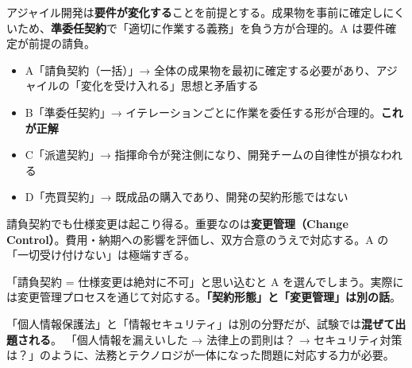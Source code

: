
\begin{kaisetsu}
アジャイル開発は\textbf{要件が変化する}ことを前提とする。成果物を事前に確定しにくいため、\textbf{準委任契約}で「適切に作業する義務」を負う方が合理的。A は要件確定が前提の請負。
\end{kaisetsu}

\begin{goutoubun}
\begin{itemize}
  \item A「請負契約（一括）」→ 全体の成果物を最初に確定する必要があり、アジャイルの「変化を受け入れる」思想と矛盾する
  \item B「準委任契約」→ イテレーションごとに作業を委任する形が合理的。\textbf{これが正解}
  \item C「派遣契約」→ 指揮命令が発注側になり、開発チームの自律性が損なわれる
  \item D「売買契約」→ 既成品の購入であり、開発の契約形態ではない
\end{itemize}
\end{goutoubun}


\begin{kaisetsu}
請負契約でも仕様変更は起こり得る。重要なのは\textbf{変更管理（Change Control）}。費用・納期への影響を評価し、双方合意のうえで対応する。A の「一切受け付けない」は極端すぎる。
\end{kaisetsu}

\begin{trickwarn}
「請負契約 = 仕様変更は絶対に不可」と思い込むと A を選んでしまう。実際には変更管理プロセスを通じて対応する。\textbf{「契約形態」と「変更管理」は別の話}。
\end{trickwarn}



\mondaipage
{}

\begin{stumble}
「個人情報保護法」と「情報セキュリティ」は別の分野だが、試験では\textbf{混ぜて出題される}。
「個人情報を漏えいした → 法律上の罰則は？ → セキュリティ対策は？」のように、法務とテクノロジが一体になった問題に対応する力が必要。
\end{stumble}

